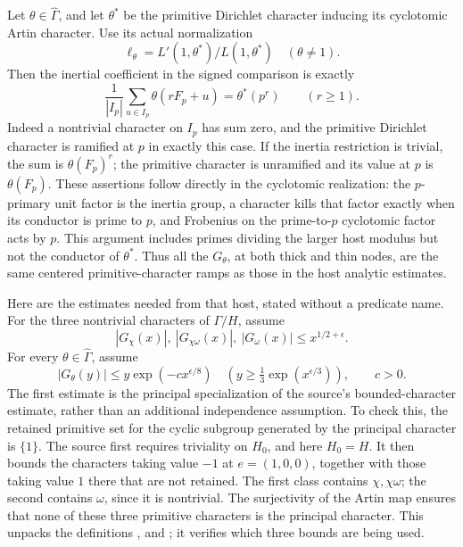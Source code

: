 Let \(\theta\in\widehat\Gamma\), and let \(\theta^*\) be the primitive
Dirichlet character inducing its cyclotomic Artin character.
Use its actual normalization
\[
                    \ell_\theta=L'(1,\theta^*)/L(1,\theta^*)
                    \quad(\theta\ne1).
\]
Then the inertial coefficient in the signed comparison is exactly
\begin{equation}\label{eq:sr-primitive-inertial-coefficient}
 \frac1{|I_p|}\sum_{u\in I_p}\theta(rF_p+u)
                         =\theta^*(p^r)\qquad(r\geq1).
\end{equation}
Indeed a nontrivial character on \(I_p\) has sum zero, and
the primitive Dirichlet character is ramified at \(p\) in exactly
this case.  If the inertia restriction is trivial, the sum is
\(\theta(F_p)^r\); the primitive character is unramified and its
value at \(p\) is \(\theta(F_p)\).
These assertions follow directly in the cyclotomic realization:
the \(p\)-primary unit factor is the inertia group, a character
kills that factor exactly when its conductor is prime to \(p\),
and Frobenius on the prime-to-\(p\) cyclotomic factor acts by \(p\).
This argument includes primes dividing the larger host modulus but
not the conductor of \(\theta^*\).
Thus all the \(G_\theta\), at both thick and thin nodes, are the
same centered primitive-character ramps as those in the host
analytic estimates.

Here are the estimates needed from that host, stated without a
predicate name.  For the three nontrivial characters of
\(\Gamma/H\), assume
\begin{equation}\label{eq:sr-host-three-quadratics}
 |G_\chi(x)|,\ |G_{\chi\omega}(x)|,\ |G_\omega(x)|
                         \leq x^{1/2+\epsilon}.
\end{equation}
For every \(\theta\in\widehat\Gamma\), assume
\begin{equation}\label{eq:sr-host-thin-analytic}
 |G_\theta(y)|\leq y\exp(-c x^{\epsilon/8})
 \quad\left(y\geq \tfrac13\exp(x^{\epsilon/3})\right),
 \qquad c>0 .
\end{equation}
The first estimate is the principal specialization of the source's
bounded-character estimate, rather than an additional independence
assumption.  To check this, the retained primitive set for the
cyclic subgroup generated by the principal character is \(\{1\}\).
The source first requires triviality on \(H_0\), and here \(H_0=H\).
It then bounds the characters taking value \(-1\) at
\(e=(1,0,0)\), together with those taking value \(1\) there that are
not retained.  The first class contains \(\chi,\chi\omega\);
the second contains \(\omega\), since it is nontrivial.
The surjectivity of the Artin map ensures that none of these
three primitive characters is the principal character.
This unpacks the definitions
,  and
; it verifies which three bounds are being used.

